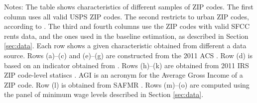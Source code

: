 \begin{table}[hbt!]
    \begin{minipage}{.95\textwidth} \footnotesize
        \vspace{2mm}
        Notes: The table shows characteristics of different samples of ZIP codes.
        The first column uses all valid USPS ZIP codes.
        The second restricts to urban ZIP codes, according to \textcite{MissouriCDC}.
        The third and fourth columns use the ZIP codes with valid SFCC rents 
        data, and the ones used in the baseline estimation, as described in
        Section \ref{sec:data}.
        Each row shows a given characteristic obtained from different a data 
        source.
        Rows (a)--(c) and (e)--(g) are constructed from the 2011 ACS \textcite{ACS}.
        Row (d) is based on an indicator obtained from \textcite{MissouriCDC}.
        Rows (h)--(k) are obtained from 2011 IRS ZIP code-level statiscs \textcite{IRS}.
        AGI is an acronym for the Average Gross Income of a ZIP code.
        Row (l) is obtained from SAFMR \textcite{hudSAFMR}.
        Rows (m)--(o) are computed using the panel of minimum wage levels 
        described in Section \ref{sec:data}.
    \end{minipage}
\end{table}
